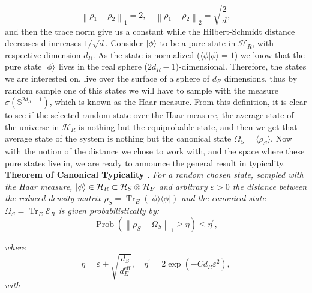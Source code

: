 \begin{equation}
\left\|\rho_{1}-\rho_{2}\right\|_{1}=2, \quad\left\|\rho_{1}-\rho_{2}\right\|_{2}=\sqrt{\frac{2}{d}},
\label{CH1:Example_1}
\end{equation}
and then the trace norm give us a constant while the Hilbert-Schmidt distance decreases d increases $1/\sqrt{d}$.
\newline
Consider $\mathinner{|{\phi}\rangle}$ to be a pure state in $\mathcal{H}_R$, with respective dimension $d_R$. As the state is normalized ($\langle\phi | \phi\rangle=1$) we know that the pure state $\mathinner{|{\phi}\rangle}$ lives in the real sphere ($2d_R-1$)-dimensional. Therefore, the states we are interested on, live over the surface of a sphere of $d_R$ dimensions, thus by random sample one of this states we will have to sample with the measure $\sigma(\mathbb{S}^{2d_R-1})$, which is known as the Haar measure. From this definition, it is clear to see if the selected random state over the Haar measure, the average state of the universe in $\mathcal{H}_R$ is nothing but the equiprobable state, and then we get that average state of the system is nothing but the canonical state $\Omega_S = \langle \rho_S\rangle$.
\newline
Now with the notion of the distance we chose to work with, and the space where these pure states live in, we are ready to announce the general result in typicality.
\newline
\textbf{Theorem of Canonical Typicality \cite{popescu_entanglement_2006,popescu_foundations_2005}}.
\newline
\textit{For a random chosen state, sampled with the Haar measure, $\mathinner{|{\phi}\rangle}\in\mathcal{H}_R\subset\mathcal{H}_S\otimes\mathcal{H}_B$ and arbitrary $\varepsilon >0$ the distance between the reduced density matrix $\rho_{S}=\operatorname{Tr}_{E}(|\phi\rangle\langle\phi|)$ and the canonical state $\Omega_S=\operatorname{Tr}_E\mathcal{E}_R$ is given probabilistically by:}
\begin{equation}
\operatorname{Prob}\left(\left\|\rho_{S}-\Omega_{S}\right\|_{1} \geq \eta\right) \leq \eta^{\prime},
\label{CH1:Typicality_result_1}
\end{equation}

\textit{where}
\begin{equation}
\eta=\varepsilon+\sqrt{\frac{d_{S}}{d_{E}^{\mathrm{eff}}}}, \quad \eta^{\prime}=2 \exp \left(-C d_{R} \varepsilon^{2}\right),
\label{CH1:Typicality_result_1_1}
\end{equation}
\textit{with}

